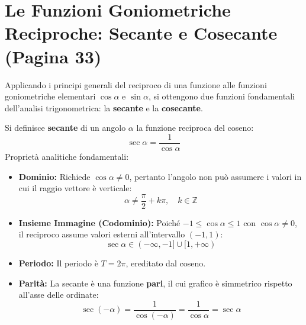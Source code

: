 \documentclass[11pt,a4paper,oneside]{report}
\begin{document}
\section{Le Funzioni Goniometriche Reciproche: Secante e Cosecante (Pagina 33)}

Applicando i principi generali del reciproco di una funzione alle funzioni goniometriche elementari $\cos\alpha$ e $\sin\alpha$, si ottengono due funzioni fondamentali dell'analisi trigonometrica: la \textbf{secante} e la \textbf{cosecante}.

\begin{definizione}
Si definisce \textbf{secante} di un angolo $\alpha$ la funzione reciproca del coseno:
\begin{equation}
    \sec\alpha = \frac{1}{\cos\alpha}
\end{equation}
Propriet\`a analitiche fondamentali:
\begin{itemize}[leftmargin=2em]
    \item \textbf{Dominio:} Richiede $\cos\alpha \neq 0$, pertanto l'angolo non pu\`o assumere i valori in cui il raggio vettore \`e verticale:
    \begin{equation}
        \alpha \neq \frac{\pi}{2} + k\pi, \quad k \in \mathbb{Z}
    \end{equation}
    \item \textbf{Insieme Immagine (Codominio):} Poich\'e $-1 \le \cos\alpha \le 1$ con $\cos\alpha \neq 0$, il reciproco assume valori esterni all'intervallo $(-1, 1)$:
    \begin{equation}
        \sec\alpha \in (-\infty, -1] \cup [1, +\infty)
    \end{equation}
    \item \textbf{Periodo:} Il periodo \`e $T = 2\pi$, ereditato dal coseno.
    \item \textbf{Parit\`a:} La secante \`e una funzione \textbf{pari}, il cui grafico \`e simmetrico rispetto all'asse delle ordinate:
    \begin{equation}
        \sec(-\alpha) = \frac{1}{\cos(-\alpha)} = \frac{1}{\cos\alpha} = \sec\alpha
    \end{equation}
\end{itemize}
\end{definizione}
\end{document}
